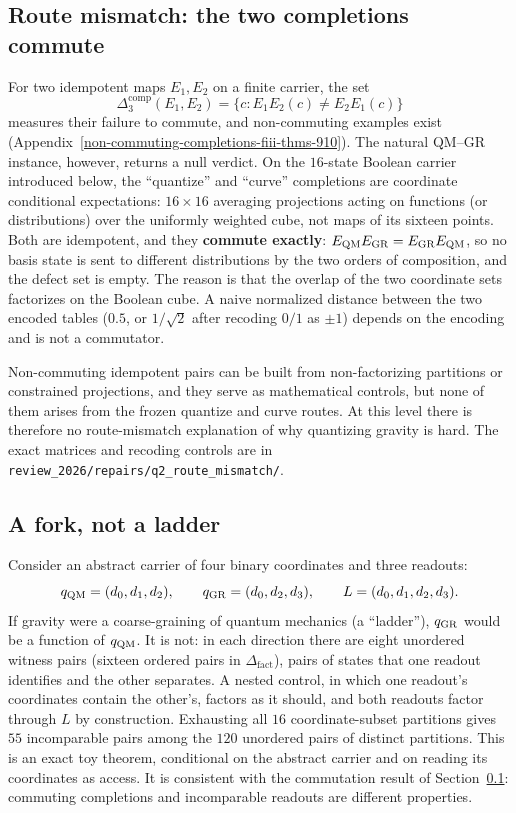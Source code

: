 \documentclass[11pt]{article}
\newcommand{\Deltafact}{\Delta_{\mathrm{fact}}}
\theoremstyle{definition}
\begin{document}
\subsection{Route mismatch: the two completions commute}\label{locating-the-obstruction-the-route-mismatch}

For two idempotent maps \(E_1,E_2\) on a finite carrier, the set
\[
\Delta_3^{\mathrm{comp}}(E_1,E_2)=\{c:E_1E_2(c)\ne E_2E_1(c)\}
\]
measures their failure to commute, and non-commuting examples exist
(Appendix~\ref{non-commuting-completions-fiii-thms-910}). The natural QM--GR instance, however, returns a null verdict.
On the \(16\)-state Boolean carrier introduced below, the ``quantize'' and ``curve'' completions are coordinate
conditional expectations: \(16\times16\) averaging projections acting on functions (or distributions) over the
uniformly weighted cube, not maps of its sixteen points. Both are idempotent, and they \textbf{commute exactly}:
\(E_{\rm QM}E_{\rm GR}=E_{\rm GR}E_{\rm QM}\), so no basis state is sent to different distributions by the two orders
of composition, and the defect set is empty. The reason is that the overlap of the two
coordinate sets factorizes on the Boolean cube. A naive normalized distance between the two encoded tables
(\(0.5\), or \(1/\sqrt2\) after recoding \(0/1\) as \(\pm1\)) depends on the encoding and is not a commutator.

Non-commuting idempotent pairs can be built from non-factorizing partitions or constrained projections, and they serve
as mathematical controls, but none of them arises from the frozen quantize and curve routes. At this level there is
therefore no route-mismatch explanation of why quantizing gravity is hard. The exact matrices and recoding controls are
in \nolinkurl{review_2026/repairs/q2_route_mismatch/}.

\subsection{A fork, not a ladder}\label{the-resolution-a-fork-not-a-ladder}

Consider an abstract carrier of four binary coordinates and three readouts:
\[
q_{\rm QM}=(d_0,d_1,d_2),\qquad q_{\rm GR}=(d_0,d_2,d_3),\qquad L=(d_0,d_1,d_2,d_3).
\]
If gravity were a coarse-graining of quantum mechanics (a ``ladder''), \(q_{\rm GR}\) would be a function of
\(q_{\rm QM}\). It is not: in each direction there are eight unordered witness pairs (sixteen ordered pairs in
\(\Deltafact\)), pairs of states that one readout identifies and the other separates. A nested control, in which one readout's coordinates contain the other's,
factors as it should, and both readouts factor through \(L\) by construction. Exhausting all \(16\) coordinate-subset
partitions gives \(55\) incomparable pairs among the \(120\) unordered pairs of distinct partitions. This is an exact
toy theorem, conditional on the abstract carrier and on reading its coordinates as access. It is consistent with the
commutation result of Section~\ref{locating-the-obstruction-the-route-mismatch}: commuting completions and
incomparable readouts are different properties.
\end{document}
